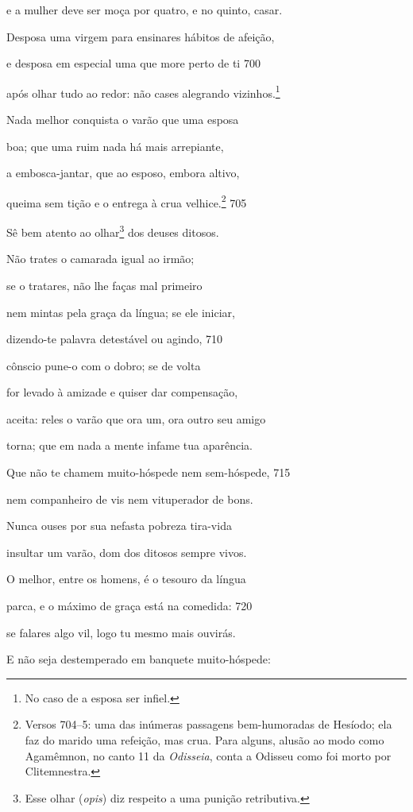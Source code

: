 e a mulher deve ser moça por quatro, e no quinto, casar.

Desposa uma virgem para ensinares hábitos de afeição,

e desposa em especial uma que more perto de ti \num{700}

após olhar tudo ao redor: não cases alegrando vizinhos.\footnote{No caso de a esposa ser infiel.}

Nada melhor conquista o varão que uma esposa

boa; que uma ruim nada há mais arrepiante,

a embosca-jantar, que ao esposo, embora altivo,

queima sem tição e o entrega à crua velhice.\footnote{Versos 704--5: uma das inúmeras passagens bem-humoradas de Hesíodo; ela faz do
marido uma refeição, mas crua. Para alguns, alusão ao modo como
Agamêmnon, no canto 11 da \emph{Odisseia}, conta a Odisseu como foi
morto por Clitemnestra.} \num{705}

Sê bem atento ao olhar\footnote{Esse olhar (\emph{opis}) diz respeito a uma punição retributiva.} dos deuses ditosos.

Não trates o camarada igual ao irmão;

se o tratares, não lhe faças mal primeiro

nem mintas pela graça da língua; se ele iniciar,

dizendo-te palavra detestável ou agindo, \num{710}

cônscio pune-o com o dobro; se de volta

for levado à amizade e quiser dar compensação,

aceita: reles o varão que ora um, ora outro seu amigo

torna; que em nada a mente infame tua aparência.

Que não te chamem muito-hóspede nem sem-hóspede, \num{715}

nem companheiro de vis nem vituperador de bons.

Nunca ouses por sua nefasta pobreza tira-vida

insultar um varão, dom dos ditosos sempre vivos.

O melhor, entre os homens, é o tesouro da língua

parca, e o máximo de graça está na comedida: \num{720}

se falares algo vil, logo tu mesmo mais ouvirás.

E não seja destemperado em banquete muito-hóspede:

